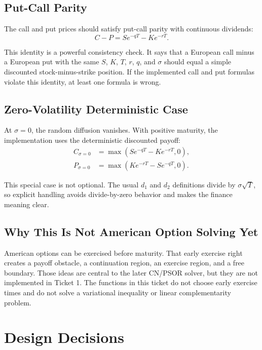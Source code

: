 \documentclass[11pt,a4paper]{article}
\begin{document}
\subsection{Put-Call Parity}

The call and put prices should satisfy put-call parity with continuous dividends:
\begin{equation}
  C - P = S e^{-qT} - K e^{-rT}.
\end{equation}

This identity is a powerful consistency check. It says that a European call minus a European put
with the same \(S\), \(K\), \(T\), \(r\), \(q\), and \(\sigma\) should equal a simple discounted
stock-minus-strike position. If the implemented call and put formulas violate this identity, at
least one formula is wrong.

\subsection{Zero-Volatility Deterministic Case}

At \(\sigma=0\), the random diffusion vanishes. With positive maturity, the implementation uses
the deterministic discounted payoff:
\begin{align}
  C_{\sigma=0} &= \max\left(S e^{-qT} - K e^{-rT}, 0\right), \\
  P_{\sigma=0} &= \max\left(K e^{-rT} - S e^{-qT}, 0\right).
\end{align}

This special case is not optional. The usual \(d_1\) and \(d_2\) definitions divide by
\(\sigma\sqrt{T}\), so explicit handling avoids divide-by-zero behavior and makes the finance
meaning clear.

\subsection{Why This Is Not American Option Solving Yet}

American options can be exercised before maturity. That early exercise right creates a payoff
obstacle, a continuation region, an exercise region, and a free boundary. Those ideas are central
to the later CN/PSOR solver, but they are not implemented in Ticket 1. The functions in this
ticket do not choose early exercise times and do not solve a variational inequality or linear
complementarity problem.

\section{Design Decisions}
\end{document}
